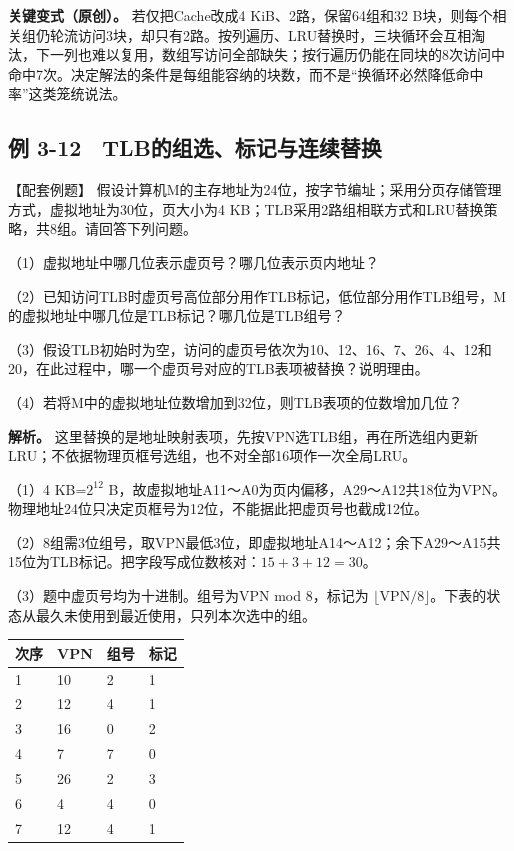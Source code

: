 \textbf{关键变式（原创）。} 若仅把Cache改成4 KiB、2路，保留64组和32 B块，则每个相关组仍轮流访问3块，却只有2路。按列遍历、LRU替换时，三块循环会互相淘汰，下一列也难以复用，数组写访问全部缺失；按行遍历仍能在同块的8次访问中命中7次。决定解法的条件是每组能容纳的块数，而不是``换循环必然降低命中率''这类笼统说法。

\subsection{例 3-12　TLB的组选、标记与连续替换}\label{CO03-30}

\begin{example}[配套例题]

【配套例题】 假设计算机M的主存地址为24位，按字节编址；采用分页存储管理方式，虚拟地址为30位，页大小为4 KB；TLB采用2路组相联方式和LRU替换策略，共8组。请回答下列问题。

（1）虚拟地址中哪几位表示虚页号？哪几位表示页内地址？

（2）已知访问TLB时虚页号高位部分用作TLB标记，低位部分用作TLB组号，M的虚拟地址中哪几位是TLB标记？哪几位是TLB组号？

（3）假设TLB初始时为空，访问的虚页号依次为10、12、16、7、26、4、12和20，在此过程中，哪一个虚页号对应的TLB表项被替换？说明理由。

（4）若将M中的虚拟地址位数增加到32位，则TLB表项的位数增加几位？

\end{example}

\textbf{解析。} 这里替换的是地址映射表项，先按VPN选TLB组，再在所选组内更新LRU；不依据物理页框号选组，也不对全部16项作一次全局LRU。

（1）4 KB=\(2^{12}\) B，故虚拟地址A11～A0为页内偏移，A29～A12共18位为VPN。物理地址24位只决定页框号为12位，不能据此把虚页号也截成12位。

（2）8组需3位组号，取VPN最低3位，即虚拟地址A14～A12；余下A29～A15共15位为TLB标记。把字段写成位数核对：\(15+3+12=30\)。

（3）题中虚页号均为十进制。组号为VPN mod 8，标记为 \(\lfloor\mathrm{VPN}/8\rfloor\)。下表的状态从最久未使用到最近使用，只列本次选中的组。

\begin{wideblock}\par\medskip\noindent\begin{minipage}{\linewidth}\fontsize{9.3}{12}\selectfont\begin{tabularx}{\linewidth}{@{}YYYY@{}}
\toprule\noalign{}
次序 & VPN & 组号 & 标记 \\
\midrule\noalign{}


1 & 10 & 2 & 1 \\
2 & 12 & 4 & 1 \\
3 & 16 & 0 & 2 \\
4 & 7 & 7 & 0 \\
5 & 26 & 2 & 3 \\
6 & 4 & 4 & 0 \\
7 & 12 & 4 & 1 \\
\bottomrule\end{tabularx}
\end{minipage}\par\medskip\end{wideblock}

